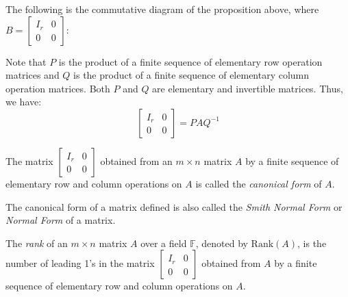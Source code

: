 \documentclass[
	11pt, %
	fleqn, %
	a4paper, %
]{LegrandOrangeBook}
\newcommand{\F}{\mathbb{F}} %
\newcommand{\rank}[1]{\text{Rank}(#1)} %
\begin{document}
The following is the commutative diagram of the proposition above, where $B = \begin{bmatrix}
    I_r & 0 \\
    0 & 0
\end{bmatrix}$:

\begin{center}
\end{center}

Note that $P$ is the product of a finite sequence of elementary row operation matrices and $Q$ is the product of a finite sequence of elementary column operation matrices. Both $P$ and $Q$ are elementary and invertible matrices. Thus, we have:
\[
    \begin{bmatrix}
        I_r & 0 \\
        0 & 0
    \end{bmatrix} = P A Q^{-1}
\]

\begin{definition}
    The matrix $\begin{bmatrix}
        I_r & 0 \\
        0 & 0
    \end{bmatrix}$ obtained from an $m \times n$ matrix $A$ by a finite sequence of elementary row and column operations on $A$ is called the \emph{canonical form} of $A$.    
\end{definition}

\begin{remark}
    The canonical form of a matrix defined is also called the \emph{Smith Normal Form} or \emph{Normal Form} of a matrix.
\end{remark}

\begin{definition}
    The \emph{rank} of an $m \times n$ matrix $A$ over a field $\F$, denoted by $\rank{A}$, is the number of leading 1's in the matrix $\begin{bmatrix}
        I_r & 0 \\
        0 & 0
    \end{bmatrix}$ obtained from $A$ by a finite sequence of elementary row and column operations on $A$.
\end{definition}
\end{document}

